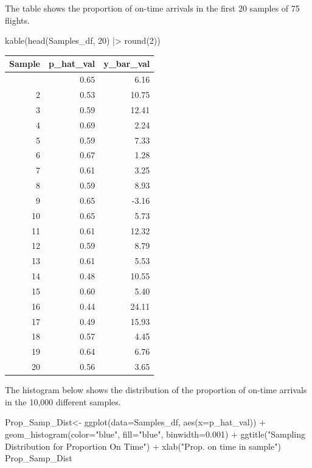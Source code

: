 \documentclass[
  letterpaper,
  DIV=11,
  numbers=noendperiod]{scrreprt}
\newenvironment{Shaded}{\begin{snugshade}}{\end{snugshade}}
\newcommand{\AttributeTok}[1]{\textcolor[rgb]{0.40,0.45,0.13}{#1}}
\newcommand{\DecValTok}[1]{\textcolor[rgb]{0.68,0.00,0.00}{#1}}
\newcommand{\FloatTok}[1]{\textcolor[rgb]{0.68,0.00,0.00}{#1}}
\newcommand{\FunctionTok}[1]{\textcolor[rgb]{0.28,0.35,0.67}{#1}}
\newcommand{\NormalTok}[1]{\textcolor[rgb]{0.00,0.23,0.31}{#1}}
\newcommand{\OtherTok}[1]{\textcolor[rgb]{0.00,0.23,0.31}{#1}}
\newcommand{\SpecialCharTok}[1]{\textcolor[rgb]{0.37,0.37,0.37}{#1}}
\newcommand{\StringTok}[1]{\textcolor[rgb]{0.13,0.47,0.30}{#1}}
\begin{document}
The table shows the proportion of on-time arrivals in the first 20
samples of 75 flights.

\begin{Shaded}
\begin{Highlighting}[]
\FunctionTok{kable}\NormalTok{(}\FunctionTok{head}\NormalTok{(Samples\_df, }\DecValTok{20}\NormalTok{) }\SpecialCharTok{|\textgreater{}} \FunctionTok{round}\NormalTok{(}\DecValTok{2}\NormalTok{))}
\end{Highlighting}
\end{Shaded}

\begin{longtable}[]{@{}rrr@{}}
\toprule\noalign{}
Sample & p\_hat\_val & y\_bar\_val \\
\midrule\noalign{}
\endhead
\bottomrule\noalign{}
\endlastfoot
1 & 0.65 & 6.16 \\
2 & 0.53 & 10.75 \\
3 & 0.59 & 12.41 \\
4 & 0.69 & 2.24 \\
5 & 0.59 & 7.33 \\
6 & 0.67 & 1.28 \\
7 & 0.61 & 3.25 \\
8 & 0.59 & 8.93 \\
9 & 0.65 & -3.16 \\
10 & 0.65 & 5.73 \\
11 & 0.61 & 12.32 \\
12 & 0.59 & 8.79 \\
13 & 0.61 & 5.53 \\
14 & 0.48 & 10.55 \\
15 & 0.60 & 5.40 \\
16 & 0.44 & 24.11 \\
17 & 0.49 & 15.93 \\
18 & 0.57 & 4.45 \\
19 & 0.64 & 6.76 \\
20 & 0.56 & 3.65 \\
\end{longtable}

The histogram below shows the distribution of the proportion of on-time
arrivals in the 10,000 different samples.

\begin{Shaded}
\begin{Highlighting}[]
\NormalTok{Prop\_Samp\_Dist}\OtherTok{\textless{}{-}} \FunctionTok{ggplot}\NormalTok{(}\AttributeTok{data=}\NormalTok{Samples\_df, }\FunctionTok{aes}\NormalTok{(}\AttributeTok{x=}\NormalTok{p\_hat\_val)) }\SpecialCharTok{+}
  \FunctionTok{geom\_histogram}\NormalTok{(}\AttributeTok{color=}\StringTok{"blue"}\NormalTok{, }\AttributeTok{fill=}\StringTok{"blue"}\NormalTok{, }\AttributeTok{binwidth=}\FloatTok{0.001}\NormalTok{) }\SpecialCharTok{+} 
  \FunctionTok{ggtitle}\NormalTok{(}\StringTok{"Sampling Distribution for Proportion On Time"}\NormalTok{) }\SpecialCharTok{+} 
  \FunctionTok{xlab}\NormalTok{(}\StringTok{"Prop. on time in sample"}\NormalTok{)}
\NormalTok{Prop\_Samp\_Dist}
\end{Highlighting}
\end{Shaded}
\end{document}
